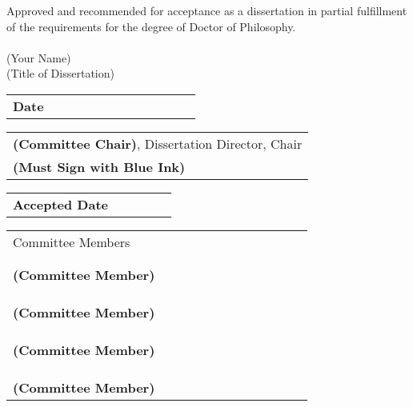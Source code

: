 
\thispagestyle{plain}

Approved and recommended for acceptance as a dissertation in partial fulfillment of the requirements for the degree of Doctor of Philosophy.
\\
\\
(Your Name) \\
(Title of Dissertation)

\vspace{.1in}

\begin{tabular}{l}
\\
\hline
\textbf{Date \ \ \ \ \ \ \ \ \ \ \ \ \ \ \ \ \ \ \ }
\end{tabular}

\begin{flushright}
\begin{tabular}{l}
\\
\hline
\textbf{(Committee Chair)}, Dissertation Director, Chair \\ 
\textbf{(Must Sign with Blue Ink)}
\end{tabular}

\vspace{.05in}

\end{flushright}

\begin{tabular}{l}
\\
\hline
\textbf{Accepted Date \ \ \ \ \ \ \ }
\end{tabular}


\begin{flushright}
\begin{tabular}{l}
Committee Members \ \ \ \ \ \ \ \ \ \ \ \ \ \ \ \ \ \ \ \ \ \ \ \ \ \
\\ 
\\
\\
\hline
\textbf{(Committee Member)}\\
\\ 
\\
\\
\hline
\textbf{(Committee Member)}\\
\\ 
\\
\\
\hline
\textbf{(Committee Member)}\\
\\
\\
\\
\hline
\textbf{(Committee Member)}\\
\end{tabular}
\end{flushright}
\newpage
